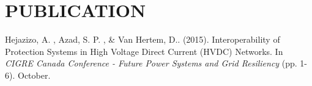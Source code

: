 \section{PUBLICATION}
Hejazizo, A. , Azad, S. P. , \& Van Hertem, D.. (2015). Interoperability of Protection Systems in High Voltage Direct Current (HVDC) Networks. In \textit{CIGRE Canada Conference - Future Power Systems and Grid Resiliency} (pp. 1-6). October.


%


\vspace{-1em}

